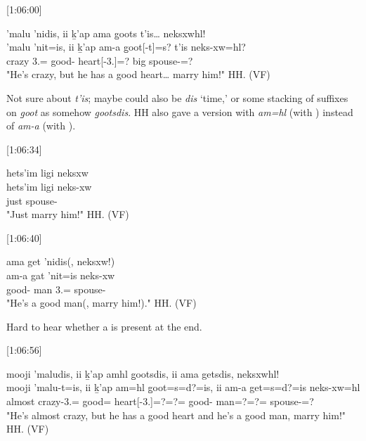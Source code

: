 [1:06:00]
\begin{exe}
    \ex \glll
    ’malu ’nidis, ii ḵ'ap ama g̱oots t’is… neksxwhl! \\
    ’malu ’nit=is, ii ḵ'ap am-a g̱oot[-t]=s? t’is  neks-xw=hl? \\
    crazy 3.\Iii=\Qudd{} \Ccnj{} \Verum{} good-\Attr{} heart[-3.\Ii]=\Pn? big spouse-\Val=\Cn? \\
    \glt "He's crazy, but he has a good heart… marry him!" \hfill HH.\ElicitationDate{} (VF)
\end{exe}

Not sure about \textit{t’is}; maybe could also be \textit{dis} `time,' or some stacking of suffixes on \textit{g̱oot} as somehow \textit{g̱ootsdis}. HH also gave a version with \textit{am=hl} (with \Cn) instead of \textit{am-a} (with \Attr).

[1:06:34]
\begin{exe}
    \ex \glll
    hets'im ligi neksxw \\
    hets'im ligi neks-xw \\
    just \Dwid{} spouse-\Val{} \\
    \glt "Just marry him!" \hfill HH.\ElicitationDate{} (VF)
\end{exe}

[1:06:40]
\begin{exe}
    \ex \glll
    ama get ’nidis(, neksxw!)  \\
    am-a gat ’nit=is neks-xw \\
    good-\Attr{} man 3.\Iii=\Qudd{} spouse-\Val{} \\
    \glt "He's a good man(, marry him!)." \hfill HH.\ElicitationDate{} (VF)
\end{exe}

Hard to hear whether a \Cn{} is present at the end.

[1:06:56]
\begin{exe}
    \ex \glll
    mooji ’maludis, ii ḵ’ap amhl g̱ootsdis, ii ama getsdis, neksxwhl! \\
    mooji ’malu-t=is, ii ḵ’ap am=hl g̱oot=s=d?=is, ii am-a get=s=d?=is neks-xw=hl \\
    almost crazy-3.\Ii=\Qudd{} \Ccnj{} \Verum{} good=\Cn{} heart[-3.\Ii]=?=?=\Qudd \Ccnj{} good-\Attr{} man=?=?=\Qudd{} spouse-\Val=\Cn? \\
    \glt "He's almost crazy, but he has a good heart and he's a good man, marry him!" \hfill HH.\ElicitationDate{} (VF)
\end{exe}

